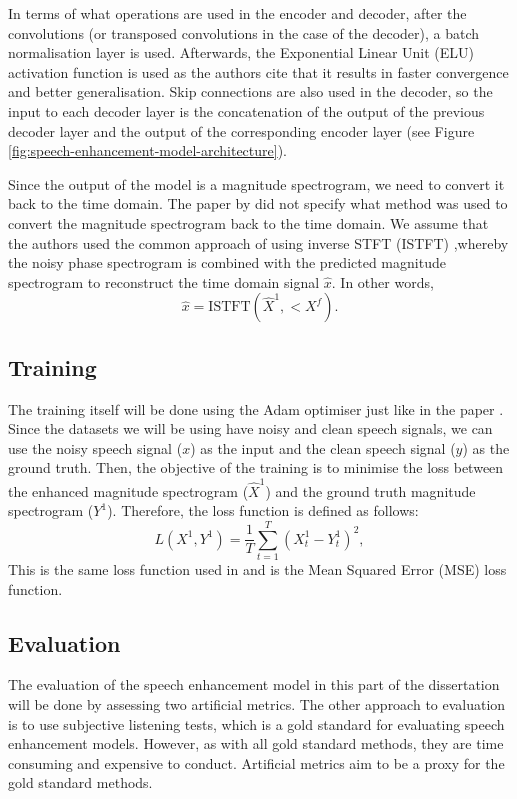 \documentclass[logo,bsc,singlespacing,parskip,online]{infthesis}
\begin{document}
In terms of what operations are used in the encoder and decoder, after the convolutions (or transposed convolutions in the case of the decoder),
a batch normalisation layer is used. Afterwards, the Exponential Linear Unit (ELU) activation function is used 
as the authors cite that it results in faster convergence and better generalisation. Skip connections 
are also used in the decoder, so the input to each decoder layer is the concatenation of the output of the previous decoder layer 
and the output of the corresponding encoder layer (see Figure \ref{fig:speech-enhancement-model-architecture}).

Since the output of the model is a magnitude spectrogram, we need to convert it back to the time domain. 
The paper by \citet{tan18_interspeech} did not specify what method was used to convert the magnitude spectrogram back to the time domain.
We assume that the authors used the common approach of using inverse STFT (ISTFT) \citep{xu_regression_2015},whereby the noisy phase spectrogram 
is combined with the predicted magnitude spectrogram to reconstruct the time domain signal $\hat{x}$. In other words,
\[
\hat{x} = \text{ISTFT}(\hat{X}^{1}, <X^{f}).
\]
\subsection{Training}
The training itself will be done using the Adam optimiser just like in the paper \citep{tan18_interspeech}.
Since the datasets we will be using have noisy and clean speech signals, we can use the noisy speech signal ($x$) as the input
and the clean speech signal ($y$) as the ground truth.
Then, the objective of the training is to minimise the loss between the enhanced magnitude spectrogram ($\hat{X}^{1}$) 
and the ground truth magnitude spectrogram ($Y^{1}$).
Therefore, the loss function is defined as follows:
\[
L(X^{1}, Y^{1}) = \frac{1}{T} \sum_{t=1}^{T} (X^{1}_t - Y^{1}_t)^2,
\]
This is the same loss function used in \citet{tan18_interspeech} and is the Mean Squared Error (MSE) loss function.

\subsection{Evaluation}
The evaluation of the speech enhancement model in this part of the dissertation will be 
done by assessing two artificial metrics. The other approach to evaluation is 
to use subjective listening tests, which is a gold standard for evaluating speech enhancement models.
However, as with all gold standard methods, they are time consuming and expensive to conduct. 
Artificial metrics aim to be a proxy for the gold standard methods. 
\end{document}
